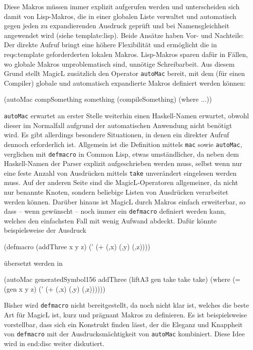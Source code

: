 \documentclass[12pt, a4paper, bibgerm]{scrbook}
\newenvironment{DIFnomarkup}{}{}
\newcommand\icode[1]{\lstinline?#1?}
\newcommand\sref{}
\newcommand{\sees}[1]{(siehe \sref{#1})}
\begin{document}
Diese Makros müssen immer explizit aufgerufen werden und unterscheiden
sich damit von Lisp-Makros, die in einer globalen Liste verwaltet und
automatisch gegen jeden zu expandierenden Ausdruck geprüft und bei
Namensgleichheit angewendet wird \sees{template:lisp}. Beide Ansätze
haben Vor- und Nachteile: Der direkte Aufruf bringt eine höhere
Flexibilität und ermöglicht die in \sref{reqs:template} geforderderten
lokalen Makros. Lisp-Makros sparen dafür in Fällen, wo globale Makros
unproblematisch sind, unnötige Schreibarbeit. Aus diesem Grund stellt
MagicL zusätzlich den Operator \icode{autoMac} bereit, mit dem (für
einen Compiler) globale und automatisch expandierte Makros definiert
werden können:
\begin{DIFnomarkup}\begin{code}
(autoMac compSomething something
    (compileSomething)
  (where ...))
\end{code}\end{DIFnomarkup}
\icode{autoMac} erwartet an erster Stelle weiterhin einen Haskell-Namen
erwartet, obwohl dieser im Normalfall aufgrund der automatischen
Anwendung nicht benötigt wird. Es gibt allerdings besondere Situationen,
in denen ein direkter Aufruf dennoch erforderlich ist. Allgemein ist die
Definition mittels \icode{mac} sowie \icode{autoMac}, verglichen mit
\icode{defmacro} in Common Lisp, etwas umständlicher, da neben dem
Haskell-Namen der Parser explizit aufgeschrieben werden muss, selbst
wenn nur eine feste Anzahl von Ausdrücken mittels \icode{take}
unverändert eingelesen werden muss. Auf der anderen Seite sind die
MagicL-Operatoren allgemeiner, da nicht nur benannte Knoten, sondern
beliebige Listen von Ausdrücken verarbeitet werden können. Darüber
hinaus ist MagicL durch Makros einfach erweiterbar, so dass -- wenn
gewünscht -- noch immer ein \icode{defmacro} definiert werden kann,
welches den einfachsten Fall mit wenig Aufwand abdeckt. Dafür könnte
beispielsweise der Ausdruck
\begin{DIFnomarkup}\begin{code}
(defmacro (addThree x y z)
  (' (+ (,x) (,y) (,z))))
\end{code}\end{DIFnomarkup}
übersetzt werden in
\begin{DIFnomarkup}\begin{code}
(autoMac generatedSymbol156 addThree
   (liftA3 gen take take take)
  (where (= (gen x y z)
            (' (+ (,x) (,y) (,z))))))
\end{code}\end{DIFnomarkup}
Bisher wird \icode{defmacro} nicht bereitgestellt, da noch nicht klar
ist, welches die beste Art für MagicL ist, kurz und prägnant Makros zu
definieren. Es ist beispielsweise vorstellbar, dass sich ein Konstrukt
finden lässt, der die Eleganz und Knappheit von \icode{defmacro} mit der
Ausdrucksmächtigkeit von \icode{autoMac} kombiniert. Diese Idee wird in
\sref{end:disc} weiter diskutiert.
\end{document}
